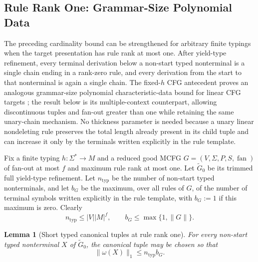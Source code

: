 \documentclass[11pt]{article}
\numberwithin{equation}{section}
\theoremstyle{plain}
\newtheorem{lemma}[theorem]{Lemma}
\theoremstyle{definition}
\theoremstyle{remark}
\newcommand{\fan}{\operatorname{fan}}
\begin{document}
\subsection{Rule Rank One: Grammar-Size Polynomial Data}
\label{subsec:rankone-polydata}

The preceding cardinality bound can be strengthened for arbitrary finite
typings when the target presentation has rule rank at most one.  After yield-type refinement, every terminal derivation below a non-start
typed nonterminal is a single chain ending in a rank-zero rule, and every
derivation from the start to that nonterminal is again a single chain.  The fixed-$h$ CFG antecedent proves an analogous
grammar-size polynomial characteristic-data bound for linear CFG targets
\cite{kuriyamaCFG}; the result below is its multiple-context counterpart,
allowing discontinuous tuples and fan-out greater than one while retaining the
same unary-chain mechanism.  No thickness parameter is needed because a unary
linear nondeleting rule preserves the total length already present in its child
tuple and can increase it only by the terminals written explicitly in the rule
template.

Fix a finite typing $h:\Sigma^*\to M$ and a reduced good MCFG
$G=(V,\Sigma,P,S,\fan)$ of fan-out at most $f$ and maximum rule rank at most
one.  Let $\widetilde G_0$ be its trimmed full yield-type refinement.  Let $n_{\mathrm{typ}}$ be the number of non-start typed nonterminals, and let
$b_G$ be the maximum, over all rules of $G$, of the number of terminal
symbols written explicitly in the rule template, with $b_G:=1$ if this maximum
is zero.  Clearly
\[
  n_{\mathrm{typ}}\le |V||M|^f,
  \qquad
  b_G\le \max\{1,\|G\|\}.
\]

\begin{lemma}[Short typed canonical tuples at rule rank one]
\label{lem:rankone-short-canonical}
For every non-start typed nonterminal $X$ of $\widetilde G_0$, the
canonical tuple may be chosen so that
\[
  \|\omega(X)\|_1\le n_{\mathrm{typ}} b_G.
\]
\end{lemma}
\end{document}
